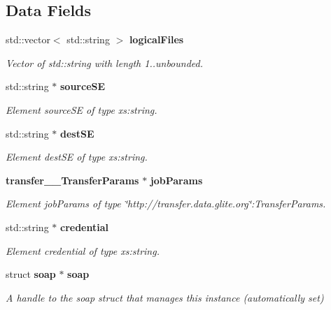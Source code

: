 \subsection*{Data Fields}
\begin{DoxyCompactItemize}
\item 
std::vector$<$ std::string $>$ {\bf logicalFiles}
\begin{DoxyCompactList}\small\item\em Vector of std::string with length 1..unbounded. \item\end{DoxyCompactList}\item 
std::string $\ast$ {\bf sourceSE}
\begin{DoxyCompactList}\small\item\em Element sourceSE of type xs:string. \item\end{DoxyCompactList}\item 
std::string $\ast$ {\bf destSE}
\begin{DoxyCompactList}\small\item\em Element destSE of type xs:string. \item\end{DoxyCompactList}\item 
{\bf transfer\_\-\_\-TransferParams} $\ast$ {\bf jobParams}
\begin{DoxyCompactList}\small\item\em Element jobParams of type \char`\"{}http://transfer.data.glite.org\char`\"{}:TransferParams. \item\end{DoxyCompactList}\item 
std::string $\ast$ {\bf credential}
\begin{DoxyCompactList}\small\item\em Element credential of type xs:string. \item\end{DoxyCompactList}\item 
struct {\bf soap} $\ast$ {\bf soap}\label{classtransfer____PlacementJob_a443d5a1ce3cca0448d6ce22479df4425}

\begin{DoxyCompactList}\small\item\em A handle to the soap struct that manages this instance (automatically set) \item\end{DoxyCompactList}\end{DoxyCompactItemize}


